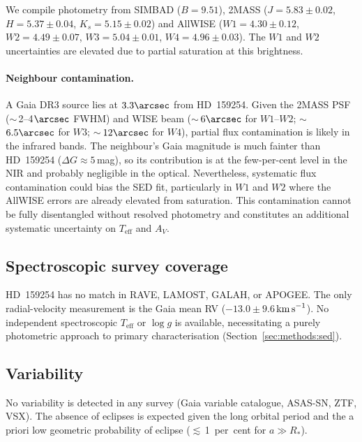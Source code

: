 \documentclass[usenatbib,fleqn]{mnras}
\newcommand{\kms}{{\rm km\,s}^{-1}}
\begin{document}
We compile photometry from SIMBAD ($B = 9.51$), 2MASS
($J = 5.83 \pm 0.02$, $H = 5.37 \pm 0.04$,
$K_s = 5.15 \pm 0.02$) and AllWISE
($W1 = 4.30 \pm 0.12$, $W2 = 4.49 \pm 0.07$,
$W3 = 5.04 \pm 0.01$, $W4 = 4.96 \pm 0.03$).
The $W1$ and $W2$ uncertainties are elevated due to partial
saturation at this brightness.

\paragraph{Neighbour contamination.}
A Gaia DR3 source lies at $3.3\arcsec$ from HD~159254.  Given the
2MASS PSF ($\sim$\,2--4$\arcsec$ FWHM) and WISE beam
($\sim$\,$6\arcsec$ for $W1$--$W2$; $\sim$\,$6.5\arcsec$ for
$W3$; $\sim$\,$12\arcsec$ for $W4$), partial flux contamination
is likely in the infrared bands.  The neighbour's Gaia magnitude
is much fainter than HD~159254 ($\Delta G \approx 5$\,mag), so
its contribution is at the few-per-cent level in the NIR and
probably negligible in the optical.  Nevertheless, systematic
flux contamination could bias the SED fit, particularly in $W1$
and $W2$ where the AllWISE errors are already elevated from
saturation.  This contamination cannot be fully disentangled
without resolved photometry and constitutes an additional
systematic uncertainty on $T_\mathrm{eff}$ and $A_V$.

\subsection{Spectroscopic survey coverage}
\label{sec:data:spectro}

HD~159254 has no match in RAVE, LAMOST, GALAH, or
APOGEE\@.  The only radial-velocity measurement is the Gaia mean
RV ($-13.0 \pm 9.6$\,$\kms$).  No independent spectroscopic
$T_\mathrm{eff}$ or $\log g$ is available, necessitating a purely
photometric approach to primary characterisation
(Section~\ref{sec:methods:sed}).

\subsection{Variability}
\label{sec:data:var}

No variability is detected in any survey (Gaia variable catalogue,
ASAS-SN, ZTF, VSX).  The absence of eclipses is expected
given the long orbital period and the a priori low geometric
probability of eclipse ($\lesssim$\,1~per~cent for $a \gg R_*$).

\end{document}

